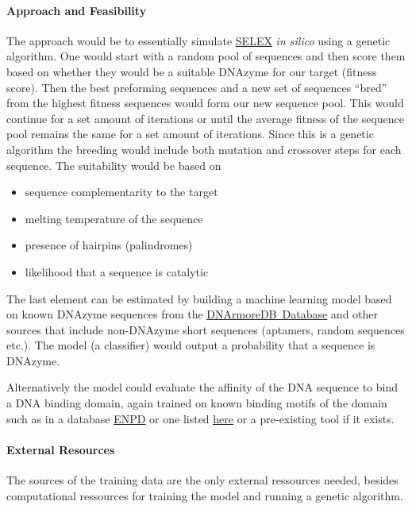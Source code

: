 \documentclass[11pt]{article}
\newcommand{\link}[2]{\href{#1}{\color{linkcolor}\setulcolor{linkcolor}\ul{\mbox{#2}}}}
\begin{document}
\paragraph{\textbf{Approach and Feasibility}}
The approach would be to essentially simulate \link{https://en.wikipedia.org/wiki/Systematic_evolution_of_ligands_by_exponential_enrichment}{SELEX} \textit{in silico} using a genetic algorithm.
One would start with a random pool of sequences and then score them based on whether they would be a suitable DNAzyme for our target (fitness score).
Then the best preforming sequences and a new set of sequences ``bred'' from the highest fitness sequences  would form our new sequence pool.
This would continue for a set amount of iterations or until the average fitness of the sequence pool remains the same for a set amount of iterations.
Since this is a genetic algorithm the breeding would include both mutation and crossover steps for each sequence.
The suitability would be based on
\begin{itemize}
    \item sequence complementarity to the target
    \item melting temperature of the sequence
    \item presence of hairpins (palindromes)
    \item likelihood that a sequence is catalytic
\end{itemize}
The last element can be estimated by building a machine learning model based on known DNAzyme sequences from the \link{https://www.genesilico.pl/DNAmoreDB/}{DNArmoreDB Database} and other sources that include non-DNAzyme short sequences (aptamers, random sequences etc.).
The model (a classifier) would output a probability that a sequence is DNAzyme.
\par
Alternatively the model could evaluate the affinity of the DNA sequence to bind a DNA binding domain, again trained on known binding motifs of the domain such as in a database \link{https://academic.oup.com/nar/article/47/D1/D322/5204332}{ENPD} or one listed \link{https://www.mdpi.com/1422-0067/16/3/5194}{here} or a pre-existing tool if it exists.
\paragraph{\textbf{External Resources}}
The sources of the training data are the only external ressources needed, besides computational ressources for training the model and running a genetic algorithm.
\end{document}
